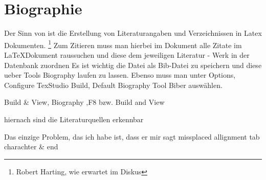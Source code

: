 \documentclass{article}
\begin{document}
	\section{Biographie}	
	Der Sinn von  ist die Erstellung von Literaturangaben und Verzeichnissen	\cite{PlatzerBernd2006BRTW}
	in Latex Dokumenten. \footnote{\label{test}Robert Harting,
		wie erwartet im Diskus}
	Zum Zitieren \cite{RostManfred2019L} muss man hierbei im Dokument alle Zitate \cite{Gogol-DöringAndreas2019AuDF} im \LaTeX Dokument raussuchen
	und diese dem jeweiligen Literatur - Werk \cite{BrunsDaniel2013Ivoa} in der Datenbank zuordnen
	Es ist wichtig die Datei als Bib-Datei \cite{HromkovicJuraj2019IiKd} zu speichern und diese ueber Tools 
	Biography laufen zu lassen. Ebenso muss man unter Options, Configure TexStudio
	Build, Default Biography Tool Biber auswählen. 
	
	Build \& View, Biography ,F8 bzw. Build and View 
	
	hiernach sind die Literaturquellen erkennbar \cite{CipraBarry1993Tr-E}
	
	Das einzige Problem, das ich habe ist, dass er mir sagt missplaced allignment tab charachter \& end \cite{FortnowLance1999RMSI}
	
	\printbibliography	
\end{document}
